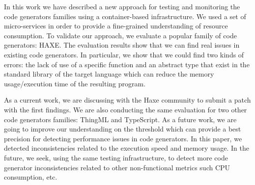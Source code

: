 In this work we have described a new approach for testing and monitoring the code generators families using a container-based infrastructure. 
We used a set of micro-services in order to provide a fine-grained understanding of resource consumption. 
To validate our approach, we evaluate a popular family of code generators: HAXE. 
The evaluation results show that we can find real issues in existing code generators. 
In particular, we show that we could find two kinds of errors: the lack of use of a specific function and an abstract type that exist in the standard library of the target language which can reduce the memory usage/execution time of the resulting program.

As a current work, we are discussing with the Haxe community to submit a patch with the first findings. 
We are also conducting the same evaluation for two other code generators families: ThingML and TypeScript. 
As a future work, we are going to improve our understanding on the threshold which can provide a best precision for detecting performance issues in code generators. 
In this paper, we detected inconsistencies related to the execution speed and memory usage. In the future, we seek, using the same testing infrastructure, to detect more code generator inconsistencies related to other non-functional metrics such CPU consumption, etc. 






